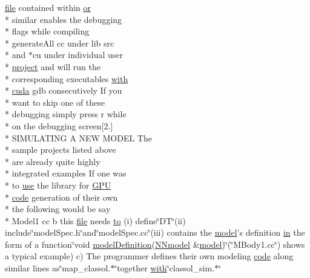 \begin{DoxyCompactItemize}
\hyperlink{README_8txt_a6f45b2930c1b79b67034355b4701dc56}{file} contained within \hyperlink{userproject_2PoissonIzh__project_2README_8txt_ad4021097ab0ba066271614bf3f4c2e27}{or} \\*
similar enables the debugging \\*
flags while compiling \\*
generate\+All cc under lib src \\*
and $\ast$cu under individual user \\*
\hyperlink{userproject_2SynDelay__project_2README_8txt_a762c750134e07a31b7965860fd292b51}{project} and will run the \\*
corresponding executables \hyperlink{userproject_2OneComp__project_2README_8txt_ace09bb40fbf4457ad9a9340a67a4fa9a}{with} \\*
\hyperlink{README_8txt_a386e5818501e36b046e9cf9ee9a1a6b0}{cuda} gdb consecutively If you \\*
want to skip one of these \\*
debugging simply press r while \\*
on the debugging screen\mbox{[}2.\mbox{]} \\*
S\+I\+M\+U\+L\+A\+T\+I\+N\+G A N\+E\+W M\+O\+D\+E\+L The \\*
sample projects listed above \\*
are already quite highly \\*
integrated examples If one was \\*
to \hyperlink{README_8txt_acf386c48a14a2099c9220d6bcde40fc8}{use} the library for \hyperlink{modelSpec_8h_a39cb9803524b6f3b783344b2f89867b4}{G\+P\+U} \\*
\hyperlink{userproject_2MBody__userdef__project_2README_8txt_aeec4e596748e7c29dd5548dae4c70685}{code} generation of their own \\*
the following would be say \\*
Model1 cc b this \hyperlink{README_8txt_a6f45b2930c1b79b67034355b4701dc56}{file} needs \hyperlink{README_8txt_add1f2ee32acc15ef77f839d4382c9768}{to} (i) define\char`\"{}D\+T\char`\"{}(ii) include\char`\"{}model\+Spec.\+h\char`\"{}and\char`\"{}model\+Spec.\+cc\char`\"{}(iii) contains the \hyperlink{README_8txt_a69fd801b7213948c12d9dd7eebb3ed14}{model}'s definition \hyperlink{README_8txt_a148897a6b2cc9cff25af80abb13426b0}{in} the form of a function\char`\"{}void \hyperlink{SynDelay_8cc_a9aeaa0a22980484b2c472564fc9f686e}{model\+Definition}(\hyperlink{classNNmodel}{N\+Nmodel} \&\hyperlink{README_8txt_a69fd801b7213948c12d9dd7eebb3ed14}{model})\char`\"{}(\char`\"{}M\+Body1.\+cc\char`\"{}) shows a typical example) c) The programmer defines their own modeling \hyperlink{userproject_2MBody__userdef__project_2README_8txt_aeec4e596748e7c29dd5548dae4c70685}{code} along similar lines as\char`\"{}map\+\_\+classol.$\ast$\char`\"{}together \hyperlink{userproject_2OneComp__project_2README_8txt_ace09bb40fbf4457ad9a9340a67a4fa9a}{with}\char`\"{}classol\+\_\+sim.$\ast$\char`\"{}

\end{DoxyCompactItemize}
